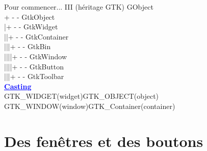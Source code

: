 \documentclass{beamer}
\begin{document}
\begin{frame}{Pour commencer... III (héritage GTK)}
GObject\\
+ - - GtkObject\\
|\hspace{0.8cm}+ - - GtkWidget\\
|\hspace{0.8cm}|\hspace{0.8cm}+ - - GtkContainer\\
|\hspace{0.8cm}|\hspace{0.8cm}|\hspace{0.8cm}+ - - GtkBin\\
|\hspace{0.8cm}|\hspace{0.8cm}|\hspace{0.8cm}|\hspace{0.8cm}+ - - GtkWindow\\
|\hspace{0.8cm}|\hspace{0.8cm}|\hspace{0.8cm}|\hspace{0.8cm}+ - - GtkButton\\
|\hspace{0.8cm}|\hspace{0.8cm}|\hspace{0.8cm}+ - - GtkToolbar\\
\vspace{0.3cm}
\textbf{\textcolor{blue}{\underline{Casting}}}\\
\vspace{0.2cm}
GTK\_WIDGET(widget)\hspace{1.1cm}GTK\_OBJECT(object)\\
GTK\_WINDOW(window)\hspace{0.8cm}GTK\_Container(container)\\
\end{frame}

\section{Des fenêtres et des boutons}
\end{document}
